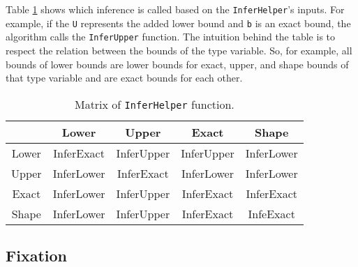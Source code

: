 \par
Table \ref{table3:InferHelper} shows which inference is called based on the \texttt{InferHelper}'s inputs. 
For example, if the \texttt{U} represents the added lower bound and \texttt{b} is an exact bound, the algorithm calls the \texttt{InferUpper} function. 
The intuition behind the table is to respect the relation between the bounds of the type variable.
So, for example, all bounds of lower bounds are lower bounds for exact, upper, and shape bounds of that type variable and are exact bounds for each other.
\begin{table}[h!]
\begin{center}
\begin{tabular}{ | c | c | c | c | c | } 
  \hline
   & Lower & Upper & Exact & Shape\\
  \hline
  Lower & InferExact  &  InferUpper & InferUpper & InferLower \\
  \hline
  Upper & InferLower  &  InferExact & InferLower & InferLower \\
  \hline
  Exact & InferLower  &  InferUpper & InferExact & InferExact \\
  \hline
  Shape & InferLower  &  InferUpper & InferExact & InfeExact \\
  \hline
\end{tabular}
\end{center}
\caption{Matrix of \texttt{InferHelper} function.}
\label{table3:InferHelper}
\end{table}

\subsection{Fixation}

